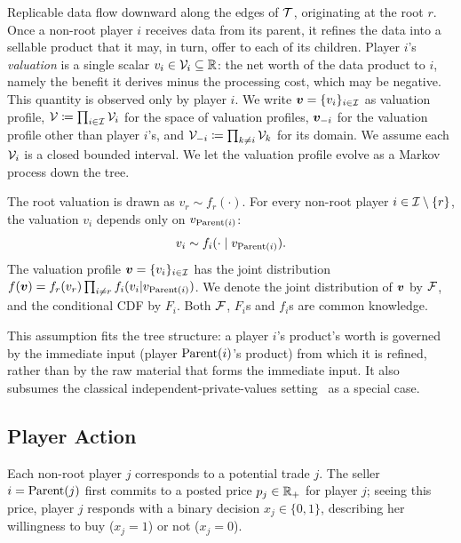 Replicable data flow downward along the edges of $\mathcal{T}$, originating at the root $r$. Once a non-root player $i$ receives data from its parent, it refines the data into a sellable product that it may, in turn, offer to each of its children. Player $i$'s \emph{valuation} is a single scalar $v_i \in \mathcal{V}_i \subseteq \mathbb{R}$: the net worth of the data product to $i$, namely the benefit it derives minus the processing cost, which may be negative. This quantity is observed only by player $i$.
We write ${\bm{v}} =\{v_i\}_{i \in \mathcal{I}}$ as valuation profile, $\mathcal{V} \coloneqq \prod_{i \in \mathcal{I}} \mathcal{V}_i$ for the space of valuation profiles, ${\bm{v}}_{-i}$ for the valuation profile other than player $i$'s, and $\mathcal{V}_{-i} \coloneqq \prod_{k \neq i} \mathcal{V}_k$ for its domain. We assume each $\mathcal{V}_i$ is a closed bounded interval.
We let the valuation profile evolve as a Markov process down the tree.

\begin{assumption}
\label{asp:markov}
The root valuation is drawn as $v_r \sim f_r(\cdot)$. For every non-root player $i \in \mathcal{I} \setminus \{r\}$, the valuation $v_i$ depends only on $v_{\operatorname{Parent}(i)}$:
\[
v_i \sim f_i(\cdot \mid v_{\operatorname{Parent}(i)}).
\]
The valuation profile ${\bm{v}} = \{v_i\}_{i \in \mathcal{I}}$ has the joint distribution $f({\bm{v}}) = f_r(v_r) \prod_{i\ne r} f_i(v_i|v_{\operatorname{Parent}(i)})$.
We denote the joint distribution of ${\bm{v}}$ by $\mathcal{F}$, and the conditional CDF by $F_i$. Both $\mathcal{F}$, $F_i$s and $f_i$s are common knowledge.
\end{assumption}

This assumption fits the tree structure: a player $i$'s product's worth is governed by the immediate input (player $\operatorname{Parent}(i)$'s product) from which it is refined, rather than by the raw material that forms the immediate input. It also subsumes the classical independent-private-values setting~\citep{myerson1981optimal} as a special case.


\subsection{Player Action}
\label{subsec:action}

Each non-root player $j$ corresponds to a potential trade $j$. The seller $i = \operatorname{Parent}(j)$ first commits to a posted price $p_j \in \mathbb{R}_+$ for player $j$; seeing this price, player $j$ responds with a binary decision $x_j \in \{0,1\}$, describing her willingness to buy ($x_j = 1$) or not ($x_j = 0$).

